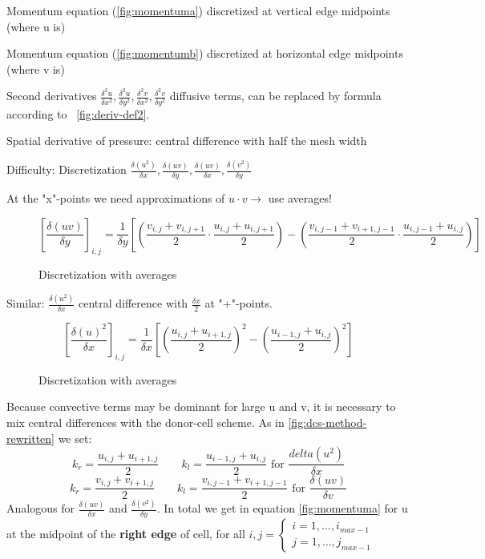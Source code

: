 \documentclass[a4paper,11pt]{scrartcl}
\begin{document}
Momentum equation (\ref{fig:momentuma}) discretized at vertical edge midpoints (where u is)

Momentum equation (\ref{fig:momentumb}) discretized at horizontal edge midpoints (where v is)

Second derivatives $\frac{\delta^2 u}{\delta x^2}, \frac{\delta^2 u}{\delta y^2}, \frac{\delta^2 v}{\delta x^2}, \frac{\delta^2 v}{\delta y^2}$ diffusive terms, can be replaced by formula according to ~\ref{fig:deriv-def2}.

Spatial derivative of pressure: central difference with half the mesh width

Difficulty: Discretization $\frac{\delta(u^2)}{\delta x}, \frac{\delta(uv)}{\delta y}, \frac{\delta(uv)}{\delta x}, \frac{\delta(v^2)}{\delta y}$

At the "x"-points we need approximations of $u \cdot v \rightarrow$ use averages!

\begin{figure}[H]
	\centering
	\[ \left[ \frac{\delta (uv)}{\delta y}\right]_{i,j} = \frac{1}{\delta y}\left[ \left( \frac{v_{i,j} + v_{i,j+1}}{2} \cdot \frac{u_{i,j} + u_{i,j+1}}{2} \right) - \left( \frac{v_{i,j-1} + v_{i+1, j-1}}{2} \cdot \frac{u_{i,j-1} + u_{i,j}}{2}\right) \right] \]
	\renewcommand{\thefigure}{3.17}
	\caption{Discretization with averages}
	\label{fig:disc-spec}
\end{figure}

Similar: $\frac{\delta(u^2)}{\delta x}$ central difference with $\frac{\delta x}{2}$ at "+"-points.

\begin{figure}[H]
	\centering
	\[ \left[ \frac{\delta (u)^2}{\delta x}\right]_{i,j} = \frac{1}{\delta x}\left[ \left( \frac{u_{i,j} + u_{i+1,j}}{2}\right)^2 - \left( \frac{u_{i-1,j} + u_{i, j}}{2}\right)^2 \right] \]
	\renewcommand{\thefigure}{3.18}
	\caption{Discretization with averages}
	\label{fig:disc-spec}
\end{figure}

Because convective terms may be dominant for large u and v, it is necessary to mix central differences with the donor-cell scheme. As in \ref{fig:dcs-method-rewritten} we set:
\[ k_r = \frac{u_{i,j} + u_{i+1,j}}{2} \qquad k_l = \frac{u_{i-1,j} + u_{i,j}}{2} \text{ for } \frac{delta(u^2)}{\delta x}\]
\[ k_r = \frac{v_{i,j} + v_{i+1,j}}{2} \qquad k_l = \frac{v_{i,j-1} + v_{i+1,j-1}}{2} \text{ for } \frac{\delta(uv)}{\delta v}\]
Analogous for $\frac{\delta(uv)}{\delta x}$ and $\frac{\delta(v^2)}{\delta y}$. In total we get in equation \ref{fig:momentuma} for u at the midpoint of the \textbf{right edge} of cell, for all $i,j = \begin{cases}
i = 1, \dots, i_{max-1} \\
j = 1, \dots, j_{max-1}
\end{cases}$
\end{document}
